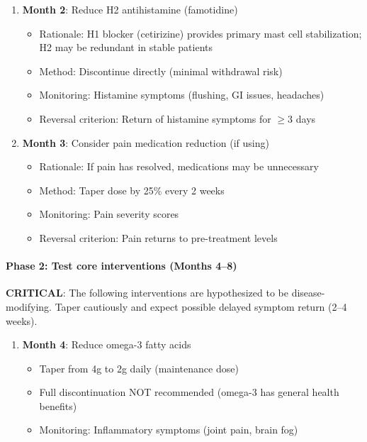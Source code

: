 \begin{protocol}
\begin{enumerate}
    \item \textbf{Month 2}: Reduce H2 antihistamine (famotidine)
    \begin{itemize}
        \item Rationale: H1 blocker (cetirizine) provides primary mast cell stabilization; H2 may be redundant in stable patients
        \item Method: Discontinue directly (minimal withdrawal risk)
        \item Monitoring: Histamine symptoms (flushing, GI issues, headaches)
        \item Reversal criterion: Return of histamine symptoms for $\geq$3 days
    \end{itemize}

    \item \textbf{Month 3}: Consider pain medication reduction (if using)
    \begin{itemize}
        \item Rationale: If pain has resolved, medications may be unnecessary
        \item Method: Taper dose by 25\% every 2 weeks
        \item Monitoring: Pain severity scores
        \item Reversal criterion: Pain returns to pre-treatment levels
    \end{itemize}
\end{enumerate}

\paragraph{Phase 2: Test core interventions (Months 4--8)}

\textbf{CRITICAL}: The following interventions are hypothesized to be disease-modifying. Taper cautiously and expect possible delayed symptom return (2--4 weeks).

\begin{enumerate}
    \item \textbf{Month 4}: Reduce omega-3 fatty acids
    \begin{itemize}
        \item Taper from 4g to 2g daily (maintenance dose)
        \item Full discontinuation NOT recommended (omega-3 has general health benefits)
        \item Monitoring: Inflammatory symptoms (joint pain, brain fog)
    \end{itemize}


\end{enumerate}
\end{protocol}
